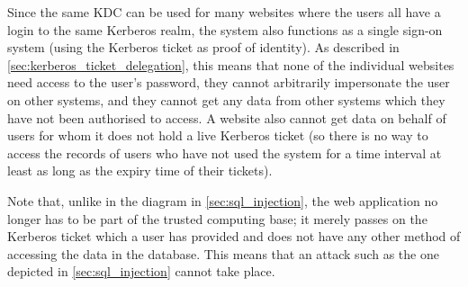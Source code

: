 \documentclass[12pt]{report}
\begin{document}
\begin{center}
\end{center}

Since the same KDC can be used for many websites where the users all have a login to the same Kerberos realm, the system also functions as a single sign-on system (using the Kerberos ticket as proof of identity). As described in \autoref{sec:kerberos_ticket_delegation}, this means that none of the individual websites need access to the user's password, they cannot arbitrarily impersonate the user on other systems, and they cannot get any data from other systems which they have not been authorised to access. A website also cannot get data on behalf of users for whom it does not hold a live Kerberos ticket (so there is no way to access the records of users who have not used the system for a time interval at least as long as the expiry time of their tickets).

Note that, unlike in the diagram in \autoref{sec:sql_injection}, the web application no longer has to be part of the trusted computing base; it merely passes on the Kerberos ticket which a user has provided and does not have any other method of accessing the data in the database. This means that an attack such as the one depicted in \autoref{sec:sql_injection} cannot take place.
\end{document}
